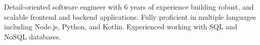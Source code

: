 

\begin{cvparagraph}

Detail-oriented software engineer with 6 years of experience building robust, and scalable frontend and backend applications. Fully proficient in multiple languages including Node.js, Python, and Kotlin. Experienced working with SQL and NoSQL databases.

\end{cvparagraph}
